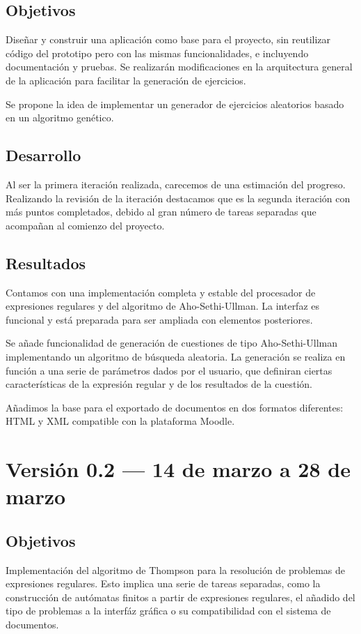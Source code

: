 \subsection{Objetivos}
Diseñar y construir una aplicación como base para el proyecto, sin reutilizar código del prototipo pero con las mismas funcionalidades, e incluyendo documentación y pruebas.
Se realizarán modificaciones en la arquitectura general de la aplicación para facilitar la generación de ejercicios.

Se propone la idea de implementar un generador de ejercicios aleatorios basado en un algoritmo genético.

\subsection{Desarrollo}
Al ser la primera iteración realizada, carecemos de una estimación del progreso.
Realizando la revisión de la iteración destacamos que es la segunda iteración con más puntos completados, debido al gran número de tareas separadas que acompañan al comienzo del proyecto.


\subsection{Resultados}
Contamos con una implementación completa y estable del procesador de expresiones regulares y del algoritmo de Aho-Sethi-Ullman.
La interfaz es funcional y está preparada para ser ampliada con elementos posteriores.

Se añade funcionalidad de generación de cuestiones de tipo Aho-Sethi-Ullman implementando un algoritmo de búsqueda aleatoria.
La generación se realiza en función a una serie de parámetros dados por el usuario, que definiran ciertas características de la expresión regular y de los resultados de la cuestión.

Añadimos la base para el exportado de documentos en dos formatos diferentes: HTML y XML compatible con la plataforma Moodle.

\section{Versión 0.2 --- 14 de marzo a 28 de marzo}
\subsection{Objetivos}
Implementación del algoritmo de Thompson para la resolución de problemas de expresiones regulares.
Esto implica una serie de tareas separadas, como la construcción de autómatas finitos a partir de expresiones regulares, el añadido del tipo de problemas a la interfáz gráfica o su compatibilidad con el sistema de documentos.

